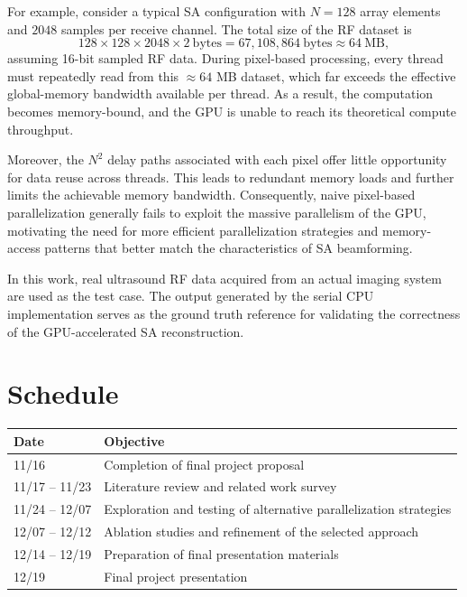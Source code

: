 \documentclass{article}
\begin{document}
For example, consider a typical SA configuration with $N=128$ array elements and $2048$ samples per receive channel. 
The total size of the RF dataset is
\[
128 \times 128 \times 2048 \times 2~\text{bytes}
= 67,108,864~\text{bytes} \approx 64~\text{MB},
\]
assuming 16-bit sampled RF data. 
During pixel-based processing, every thread must repeatedly read from this $\approx 64$ MB dataset, which far exceeds the effective global-memory bandwidth available per thread. 
As a result, the computation becomes memory-bound, and the GPU is unable to reach its theoretical compute throughput.

Moreover, the $N^2$ delay paths associated with each pixel offer little opportunity for data reuse across threads. 
This leads to redundant memory loads and further limits the achievable memory bandwidth. 
Consequently, naive pixel-based parallelization generally fails to exploit the massive parallelism of the GPU, motivating the need for more efficient parallelization strategies and memory-access patterns that better match the characteristics of SA beamforming.

In this work, real ultrasound RF data acquired from an actual imaging system are used as the test case. 
The output generated by the serial CPU implementation serves as the ground truth reference for validating the correctness of the GPU-accelerated SA reconstruction.





\section{Schedule}
\begin{table}[h]
    \centering
    \begin{tabular}{|l|l|}
        \hline
        Date & Objective\\\hline
        11/16 & Completion of final project proposal\\\hline
        11/17 -- 11/23 & Literature review and related work survey\\\hline
        11/24 -- 12/07 & Exploration and testing of alternative parallelization strategies\\\hline
        12/07 -- 12/12 & Ablation studies and refinement of the selected approach\\\hline
        12/14 -- 12/19 & Preparation of final presentation materials\\\hline
        12/19 & Final project presentation\\\hline
    \end{tabular}
\end{table}
\end{document}

